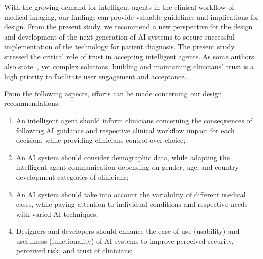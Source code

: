 With the growing demand for intelligent agents in the clinical workflow of medical imaging, our findings can provide valuable guidelines and implications for design.
From the present study, we recommend a new perspective for the design and development of the next generation of AI systems to secure successful implementation of the technology for patient diagnosis.
The present study stressed the critical role of trust in accepting intelligent agents.
As some authors also state~\cite{LIU2022107026}, yet complex solutions, building and maintaining clinicians' trust is a high priority to facilitate user engagement and acceptance.

\vspace{1.50mm}

\noindent
From the following aspects, efforts can be made concerning our design recommendations:














\vspace{1.00mm}

\begin{enumerate}
\item An intelligent agent should inform clinicians concerning the consequences of following AI guidance and respective clinical workflow impact for each decision, while providing clinicians control over choice;
\item An AI system should consider demographic data, while adapting the intelligent agent communication depending on gender, age, and country development categories of clinicians;
\item An AI system should take into account the variability of different medical cases, while paying attention to individual conditions and respective needs with varied AI techniques;
\item Designers and developers should enhance the ease of use (usability) and usefulness (functionality) of AI systems to improve perceived security, perceived risk, and trust of clinicians;
\end{enumerate}

